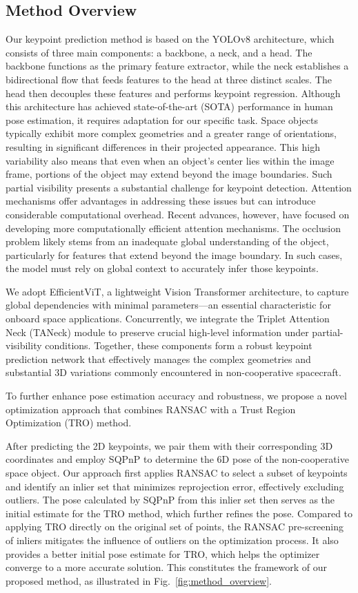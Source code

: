 \documentclass[a4paper,fleqn]{cas-sc}
\begin{document}
\subsection{Method Overview}\label{sec:Method_Overview}
Our keypoint prediction method is based on the YOLOv8 architecture, which consists of three main components: a backbone, a neck, and a head. The backbone functions as the primary feature extractor, while the neck establishes a bidirectional flow that feeds features to the head at three distinct scales. The head then decouples these features and performs keypoint regression. Although this architecture has achieved state-of-the-art (SOTA) performance in human pose estimation, it requires adaptation for our specific task. Space objects typically exhibit more complex geometries and a greater range of orientations, resulting in significant differences in their projected appearance. This high variability also means that even when an object’s center lies within the image frame, portions of the object may extend beyond the image boundaries. Such partial visibility presents a substantial challenge for keypoint detection. Attention mechanisms offer advantages in addressing these issues but can introduce considerable computational overhead. Recent advances, however, have focused on developing more computationally efficient attention mechanisms. The occlusion problem likely stems from an inadequate global understanding of the object, particularly for features that extend beyond the image boundary. In such cases, the model must rely on global context to accurately infer those keypoints.

We adopt EfficientViT, a lightweight Vision Transformer architecture, to capture global dependencies with minimal parameters—an essential characteristic for onboard space applications. Concurrently, we integrate the Triplet Attention Neck (TANeck) module to preserve crucial high-level information under partial-visibility conditions. Together, these components form a robust keypoint prediction network that effectively manages the complex geometries and substantial 3D variations commonly encountered in non-cooperative spacecraft.

To further enhance pose estimation accuracy and robustness, we propose a novel optimization approach that combines RANSAC with a Trust Region Optimization (TRO) \citep{coleman1996interior} method.

After predicting the 2D keypoints, we pair them with their corresponding 3D coordinates and employ SQPnP to determine the 6D pose of the non-cooperative space object. Our approach first applies RANSAC to select a subset of keypoints and identify an inlier set that minimizes reprojection error, effectively excluding outliers. The pose calculated by SQPnP from this inlier set then serves as the initial estimate for the TRO method, which further refines the pose. Compared to applying TRO directly on the original set of points, the RANSAC pre-screening of inliers mitigates the influence of outliers on the optimization process. It also provides a better initial pose estimate for TRO, which helps the optimizer converge to a more accurate solution. This constitutes the framework of our proposed method, as illustrated in Fig.~\ref{fig:method_overview}.
\end{document}
